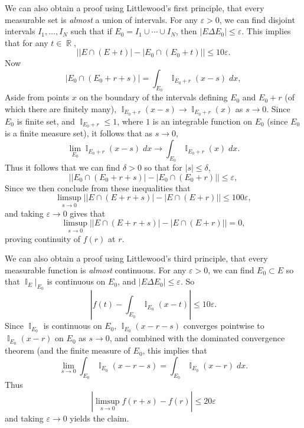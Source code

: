\documentclass[answers]{exam}
\DeclareMathOperator{\RR}{\mathbb{R}}
\DeclareMathOperator{\II}{\mathbb{I}}
\begin{document}
\begin{questions}
\begin{solution}
    We can also obtain a proof using Littlewood's first principle, that every measurable set is \emph{almost} a union of intervals. For any $\varepsilon > 0$, we can find disjoint intervals $I_1,\dots,I_N$ such that if $E_0 = I_1 \cup \cdots \cup I_N$, then $|E \Delta E_0| \leq \varepsilon$. This implies that for any $t \in \RR$,
    \[ \big| |E \cap (E + t)| - |E_0 \cap (E_0 + t)| \big| \leq 10 \varepsilon.  \]
    Now 
    \[ |E_0 \cap (E_0 + r + s)| = \int_{E_0} \II_{E_0 + r}(x - s)\; dx, \]
    Aside from points $x$ on the boundary of the intervals defining $E_0$ and $E_0 + r$ (of which there are finitely many), $\II_{E_0 + r}(x - s) \to \II_{E_0 + r}(x)$ as $s \to 0$. Since $E_0$ is  finite set, and $\II_{E_0 + r} \leq 1$, where $1$ is an integrable function on $E_0$ (since $E_0$ is a finite measure set), it follows that as $s \to 0$,
    \[ \lim_{E_0} \II_{E_0 + r}(x - s)\; dx \to \int_{E_0} \II_{E_0 + r}(x)\; dx. \]
    Thus it follows that we can find $\delta > 0$ so that for $|s| \leq \delta$,
    \[ \big| |E_0 \cap (E_0 + r + s)| - |E_0 \cap (E_0 + r)| \big| \leq \varepsilon, \]
    Since we then conclude from these inequalities that
    \[ \limsup_{s \to 0}\big| |E \cap (E + r + s)| - |E \cap (E + r)| \big| \leq 100 \varepsilon,  \]
    and taking $\varepsilon \to 0$ gives that
    \[ \limsup_{s \to 0}\big| |E \cap (E + r + s)| - |E \cap (E + r)| \big| = 0,  \]
    proving continuity of $f(r)$ at $r$.

    We can also obtain a proof using Littlewood's third principle, that every measurable function is \emph{almost} continuous. For any $\varepsilon > 0$, we can find $E_0 \subset E$ so that $\II_E|_{E_0}$ is continuous on $E_0$, and $|E \Delta E_0| \leq \varepsilon$. So
    \[ |f(t) - \int_{E_0} \II_{E_0}(x - t) | \leq 10 \varepsilon. \]
    Since $\II_{E_0}$ is continuous on $E_0$, $\II_{E_0}(x - r - s)$ converges pointwise to $\II_{E_0}(x - r)$ on $E_0$ as $s \to 0$, and combined with the dominated convergence theorem (and the finite measure of $E_0$, this implies that
    \[ \lim_{s \to 0} \int_{E_0} \II_{E_0}(x - r - s) = \int_{E_0} \II_{E_0}(x - r)\; dx. \]
    Thus
    \[ |\limsup_{s \to 0} f(r + s) - f(r)| \leq 20\varepsilon \]
    and taking $\varepsilon \to 0$ yields the claim.
    \begin{comment}
    As $r \to s$, the integrand tends to zero pointwise. And moreover, the integrands are uniformly dominated by $2\II{I}_E$, which is an integrable function. Thus the dominated convergence theorem implies that
    \[ \lim_{r \to s} f(r) - f(s) = 0. \]
    Thus $f$ is a continuous function.


\end{comment}
\end{solution}
\end{questions}
\end{document}

